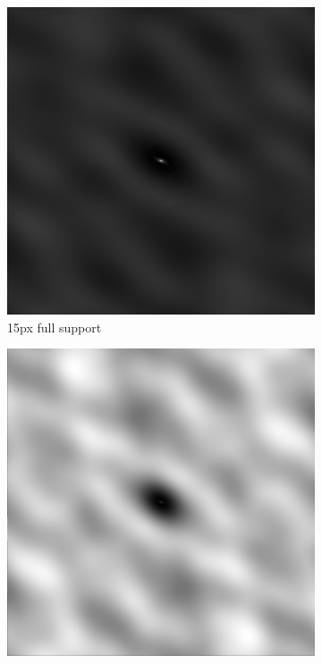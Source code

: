 \begin{figure}[ht!]
\begin{mdframed}
\begin{subfigure}[b]{0.3\textwidth}
      \includegraphics[width=\textwidth]{images/180min_single_15.png}
      \caption{15px full support}
    \end{subfigure}
    \begin{subfigure}[b]{0.3\textwidth}\centering
      \includegraphics[width=\textwidth]{images/180min_single_23.png}

\end{subfigure}
\end{mdframed}
\end{figure}
